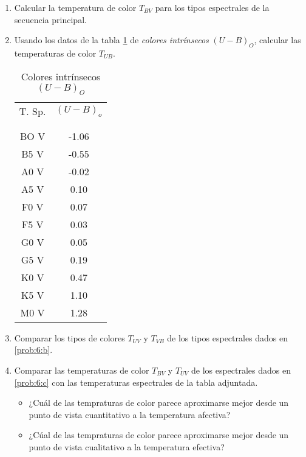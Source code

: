 \documentclass[12pt,spanish,a4paper]{practice}
\begin{document}
\begin{enumerate}[wide, labelwidth=!, labelindent=0pt, label=\textbf{\arabic*)}, ref=\arabic*]
\begin{enumerate}[label=\alph*., ref=\theenumi\alph*]
            \item \label{prob:6:a} Calcular la temperatura de color $T_{BV}$ para los tipos espectrales de la secuencia principal.

            \item \label{prob:6:b} Usando los datos de la tabla \ref{table:2} de \emph{colores intrínsecos} $\left(U-B\right)_O$, calcular las temperaturas de color $T_{UB}$.

            \begin{table}[h!]
                \centering
                \begin{tabular}{c | c}
                    T. Sp.  & $\left(U-B\right)_{o}$ \\
                    &  \\[-0.8em]\hline
                    &  \\[-0.8em]
                    BO V  & -1.06 \\
                    B5 V  & -0.55 \\
                    A0 V  & -0.02 \\
                    A5 V  &  0.10 \\
                    F0 V  &  0.07 \\
                    F5 V  &  0.03 \\
                    G0 V  &  0.05 \\
                    G5 V  &  0.19 \\
                    K0 V  &  0.47 \\
                    K5 V  &  1.10 \\
                    M0 V  &  1.28 \\
                    \hline
                \end{tabular}
                \caption{
                    Colores intrínsecos $\left(U-B\right)_O$
                }\label{table:2}
            \end{table}

            \item \label{prob:6:c} Comparar los tipos de colores $T_{UV}$ y $T_{VB}$ de los tipos espectrales dados en \ref{prob:6:b}.

            \item\label{prob:6:d} Comparar las temperaturas de color $T_{BV}$ y $T_{UV}$ de los espectrales dados en \ref{prob:6:c} con las temperaturas espectrales de la tabla adjuntada.

            \begin{itemize}
                \item\label{prob:6:d:i} ¿Cuál de las tempraturas de color parece aproximarse mejor desde un punto de vista cuantitativo a la temperatura afectiva?
                \item\label{prob:6:d:ii} ¿Cúal de las tempraturas de color parece aproximarse mejor desde un punto de vista cualitativo a la temperatura efectiva?
            \end{itemize}
        \end{enumerate}


\end{enumerate}
\end{document}
